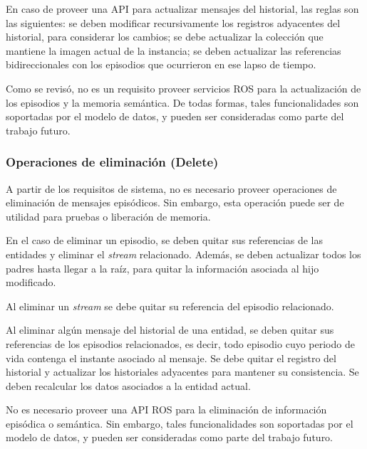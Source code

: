 En caso de proveer una API para actualizar mensajes del historial, las reglas son las siguientes: se deben modificar recursivamente los registros adyacentes del historial, para considerar los cambios; se debe actualizar la colección que mantiene la imagen actual de la instancia; se deben actualizar las referencias bidireccionales con los episodios que ocurrieron en ese lapso de tiempo.

Como se revisó, no es un requisito proveer servicios ROS para la actualización de los episodios y la memoria semántica. De todas formas, tales funcionalidades son soportadas por el modelo de datos, y pueden ser consideradas como parte del trabajo futuro.


\subsubsection{Operaciones de eliminación (Delete)}

A partir de los requisitos de sistema, no es necesario proveer operaciones de eliminación de mensajes episódicos. Sin embargo, esta operación puede ser de utilidad para pruebas o liberación de memoria.

 En el caso de eliminar un episodio, se deben quitar sus referencias de las entidades y eliminar el \textit{stream} relacionado. Además, se deben actualizar todos los padres hasta llegar a la raíz, para quitar la información asociada al hijo modificado.

Al eliminar un \textit{stream} se debe quitar su referencia del episodio relacionado.

Al eliminar algún mensaje del historial de una entidad, se deben quitar sus referencias de los episodios relacionados, es decir, todo episodio cuyo periodo de vida contenga el instante asociado al mensaje. Se debe quitar el registro del historial y actualizar los historiales adyacentes para mantener su consistencia. Se deben recalcular los datos asociados a la entidad actual.

No es necesario proveer una API ROS para la eliminación de información episódica o semántica. Sin embargo, tales funcionalidades son soportadas por el modelo de datos, y pueden ser consideradas como parte del trabajo futuro.


